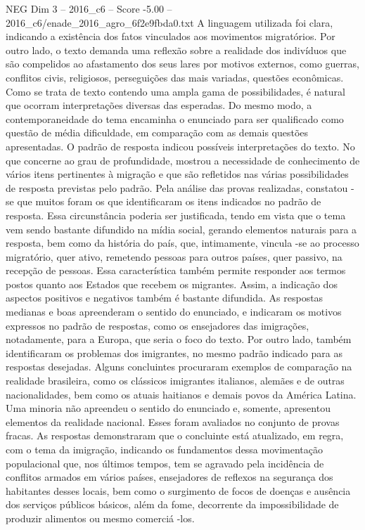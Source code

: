 \begin{textsample}{NEG Dim 3 – 2016\_c6 – Score -5.00 – 2016\_c6/enade\_2016\_agro\_6f2e9fbda0.txt}
A linguagem utilizada foi clara, indicando a existência dos fatos vinculados aos movimentos migratórios.
Por outro lado, o texto demanda uma reflexão sobre a realidade dos indivíduos que são compelidos ao afastamento dos seus lares por motivos externos, como guerras, conflitos civis, religiosos, perseguições das mais variadas, questões econômicas.
Como se trata de texto contendo uma ampla gama de possibilidades, é natural que ocorram interpretações diversas das esperadas.
Do mesmo modo, a contemporaneidade do tema encaminha o enunciado para ser qualificado como questão de média dificuldade, em comparação com as demais questões apresentadas.
O padrão de resposta indicou possíveis interpretações do texto.
No que concerne ao grau de profundidade, mostrou a necessidade de conhecimento de vários itens pertinentes à migração e que são refletidos nas várias possibilidades de resposta previstas pelo padrão.
Pela análise das provas realizadas, constatou -se que muitos foram os que identificaram os itens indicados no padrão de resposta.
Essa circunstância poderia ser justificada, tendo em vista que o tema vem sendo bastante difundido na mídia social, gerando elementos naturais para a resposta, bem como da história do país, que, intimamente, vincula -se ao processo migratório, quer ativo, remetendo pessoas para outros países, quer passivo, na recepção de pessoas.
Essa característica também permite responder aos termos postos quanto aos Estados que recebem os migrantes.
Assim, a indicação dos aspectos positivos e negativos também é bastante difundida.
As respostas medianas e boas apreenderam o sentido do enunciado, e indicaram os motivos expressos no padrão de respostas, como os ensejadores das imigrações, notadamente, para a Europa, que seria o foco do texto.
Por outro lado, também identificaram os problemas dos imigrantes, no mesmo padrão indicado para as respostas desejadas.
Alguns concluintes procuraram exemplos de comparação na realidade brasileira, como os clássicos imigrantes italianos, alemães e de outras nacionalidades, bem como os atuais haitianos e demais povos da América Latina.
Uma minoria não apreendeu o sentido do enunciado e, somente, apresentou elementos da realidade nacional.
Esses foram avaliados no conjunto de provas fracas.
As respostas demonstraram que o concluinte está atualizado, em regra, com o tema da imigração, indicando os fundamentos dessa movimentação populacional que, nos últimos tempos, tem se agravado pela incidência de conflitos armados em vários países, ensejadores de reflexos na segurança dos habitantes desses locais, bem como o surgimento de focos de doenças e ausência dos serviços públicos básicos, além da fome, decorrente da impossibilidade de produzir alimentos ou mesmo comerciá -los.

\end{textsample}
